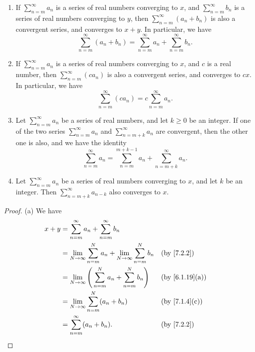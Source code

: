 \setcounter{thm}{13}
\begin{prop}\label{7.2.14}
  \begin{enumerate}
    \item If \(\sum_{n = m}^\infty a_n\) is a series of real numbers converging to \(x\), and \(\sum_{n = m}^\infty b_n\) is a series of real numbers converging to \(y\), then \(\sum_{n = m}^\infty (a_n + b_n)\) is also a convergent series, and converges to \(x + y\).
          In particular, we have
          \[
            \sum_{n = m}^\infty (a_n + b_n) = \sum_{n = m}^\infty a_n + \sum_{n = m}^\infty b_n.
          \]
    \item If \(\sum_{n = m}^\infty a_n\) is a series of real numbers converging to \(x\), and \(c\) is a real number, then \(\sum_{n = m}^\infty (c a_n)\) is also a convergent series, and converges to \(cx\).
          In particular, we have
          \[
            \sum_{n = m}^\infty (c a_n) = c \sum_{n = m}^\infty a_n.
          \]
    \item Let \(\sum_{n = m}^\infty a_n\) be a series of real numbers, and let \(k \geq 0\) be an integer.
          If one of the two series \(\sum_{n = m}^\infty a_n\) and \(\sum_{n = m + k}^\infty a_n\) are convergent, then the other one is also, and we have the identity
          \[
            \sum_{n = m}^\infty a_n = \sum_{n = m}^{m + k - 1} a_n + \sum_{n = m + k}^\infty a_n.
          \]
    \item Let \(\sum_{n = m}^\infty a_n\) be a series of real numbers converging to \(x\), and let \(k\) be an integer.
          Then \(\sum_{n = m + k}^\infty a_{n - k}\) also converges to \(x\).
  \end{enumerate}
\end{prop}

\begin{proof}{(a)}
  We have
  \begin{align*}
    x + y & = \sum_{n = m}^\infty a_n + \sum_{n = m}^\infty b_n                                                   \\
          & = \lim_{N \to \infty} \sum_{n = m}^N a_n + \lim_{N \to \infty} \sum_{n = m}^N b_n &  & \by{7.2.2}     \\
          & = \lim_{N \to \infty} \Bigg(\sum_{n = m}^N a_n + \sum_{n = m}^N b_n\Bigg)         &  & \by{6.1.19}[a] \\
          & = \lim_{N \to \infty} \sum_{n = m}^N (a_n + b_n)                                  &  & \by{7.1.4}[c]  \\
          & = \sum_{n = m}^\infty (a_n + b_n).                                                &  & \by{7.2.2}
  \end{align*}
\end{proof}

